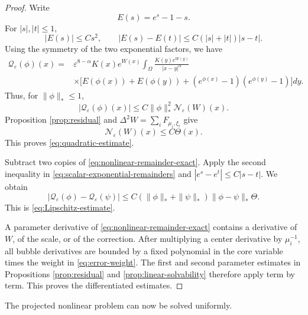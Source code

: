 \documentclass[11pt]{article}
\numberwithin{equation}{section}
\begin{document}
\begin{proof}
Write
\[
E(s)=e^s-1-s.
\]
For $|s|,|t|\leq1$,
\begin{equation}\label{eq:scalar-exponential-remainders}
|E(s)|\leq Cs^2,
\qquad
|E(s)-E(t)|\leq C(|s|+|t|)|s-t|.
\end{equation}
Using the symmetry of the two exponential factors, we have
\begin{equation}\label{eq:nonlinear-remainder-exact}
\begin{aligned}
\mathcal Q_\varepsilon(\phi)(x)
={}&\varepsilon^{8-\alpha}K(x)e^{W(x)}
\int_\Omega\frac{K(y)e^{W(y)}}{|x-y|^\alpha}\\
&\times\bigl[E(\phi(x))+E(\phi(y))
+(e^{\phi(x)}-1)(e^{\phi(y)}-1)\bigr]dy.
\end{aligned}
\end{equation}
Thus, for $\|\phi\|_*\leq1$,
\[
|\mathcal Q_\varepsilon(\phi)(x)|
\leq C\|\phi\|_*^2\mathcal N_\varepsilon(W)(x).
\]
Proposition \ref{prop:residual} and
$\Delta^2W=\sum_iF_{\mu_i,\xi_i}$ give
\begin{equation*}
\mathcal N_\varepsilon(W)(x)\leq C\Theta(x).
\end{equation*}
This proves \eqref{eq:quadratic-estimate}.

Subtract two copies of \eqref{eq:nonlinear-remainder-exact}. Apply the
second inequality in \eqref{eq:scalar-exponential-remainders} and
$|e^s-e^t|\leq C|s-t|$. We obtain
\[
|\mathcal Q_\varepsilon(\phi)-\mathcal Q_\varepsilon(\psi)|
\leq C(\|\phi\|_*+\|\psi\|_*)
\|\phi-\psi\|_*\Theta.
\]
This is \eqref{eq:Lipschitz-estimate}.

A parameter derivative of \eqref{eq:nonlinear-remainder-exact}
contains a derivative of $W$, of the scale, or of the correction.
After multiplying a center derivative by $\mu_i^{-1}$, all bubble
derivatives are bounded by a fixed polynomial in the core variable
times the weight in \eqref{eq:error-weight}. The first and second
parameter estimates in Propositions \ref{prop:residual} and
\ref{prop:linear-solvability} therefore apply term by term. This proves
the differentiated estimates.
\end{proof}

The projected nonlinear problem can now be solved uniformly.
\end{document}
